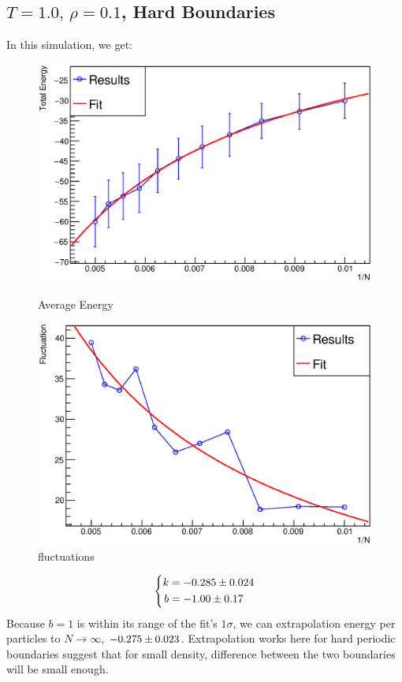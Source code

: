 \documentclass[UTF8,a4paper]{article}
\begin{document}
\subsection{$T =1.0,\, \rho = 0.1$, Hard Boundaries}
In this simulation, we get:
\begin{figure}[H]
	\centering
	\begin{minipage}[t]{0.45\textwidth}
		\centering
		\includegraphics[height=0.2\textheight]{Root Fit/fit_exp2_h.eps}
		\caption{Average Energy}
	\end{minipage}\hspace{0.5cm}
	\begin{minipage}[t]{0.45\textwidth}
		\centering
		\includegraphics[height=0.2\textheight]{Root Fit/fit_exp2_f_h.eps}
		\caption{fluctuations}
	\end{minipage}
\end{figure}

\begin{equation}
	\left\{
	\begin{aligned}
		k & = \num[separate-uncertainty = true]{-0.285+-0.024} \\
		b & = \num[separate-uncertainty = true]{-1.00+-0.17}
	\end{aligned}
	\right.
\end{equation}
Because $b=1$ is within its range of the fit's $1\sigma$, we can extrapolation energy per particles to $N\to \infty$, $\num[separate-uncertainty = true]{-0.275+-0.023}$.
Extrapolation works here for hard periodic boundaries suggest that for small density, difference between the two boundaries will be small enough.
\end{document}
